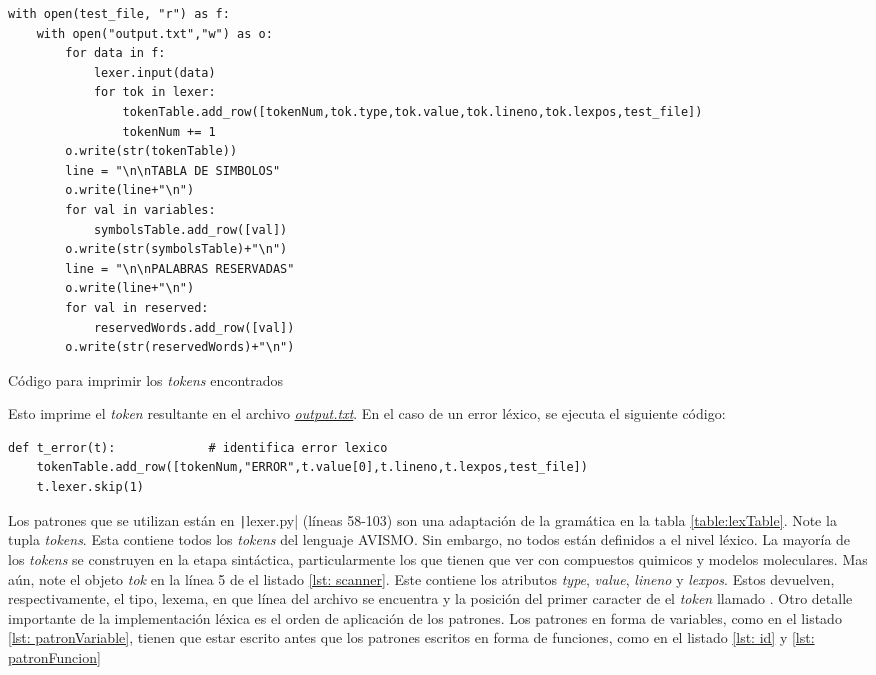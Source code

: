 \begin{listing}[H]
    \begin{verbatim}
with open(test_file, "r") as f:
    with open("output.txt","w") as o:
        for data in f:
            lexer.input(data)
            for tok in lexer:
                tokenTable.add_row([tokenNum,tok.type,tok.value,tok.lineno,tok.lexpos,test_file])
                tokenNum += 1
        o.write(str(tokenTable))
        line = "\n\nTABLA DE SIMBOLOS"
        o.write(line+"\n")
        for val in variables:
            symbolsTable.add_row([val])
        o.write(str(symbolsTable)+"\n")
        line = "\n\nPALABRAS RESERVADAS"
        o.write(line+"\n")
        for val in reserved:
            reservedWords.add_row([val])
        o.write(str(reservedWords)+"\n")
\end{verbatim}
    \caption{Código para imprimir los \textit{tokens} encontrados}
    \label{lst: scanner}
\end{listing}
Esto imprime el \textit{token} resultante en el archivo \href{https://github.com/aramis-matos/comp4999_compilers_project/blob/master/code/python_remake/output.txt}{\textit{output.txt}}. En el caso de un error léxico, se ejecuta el siguiente código:
\begin{verbatim}
def t_error(t):             # identifica error lexico
    tokenTable.add_row([tokenNum,"ERROR",t.value[0],t.lineno,t.lexpos,test_file])
    t.lexer.skip(1)
\end{verbatim}
Los patrones que se utilizan están en \texttt|lexer.py| (líneas 58-103) son una adaptación de la gramática en la tabla \ref{table:lexTable}. Note la tupla \textit{tokens}.
Esta contiene todos los \textit{tokens} del lenguaje AVISMO. Sin embargo, no todos están definidos a el nivel léxico. La mayoría de los \textit{tokens} se construyen en la etapa sintáctica, particularmente los que tienen que ver con compuestos quimicos y modelos moleculares.
Mas aún, note el objeto \textit{tok} en la línea 5 de el listado \ref{lst: scanner}. Este contiene los atributos \textit{type}, \textit{value}, \textit{lineno} y \textit{lexpos}. Estos devuelven, respectivamente, el tipo, lexema, en que línea del archivo se encuentra y la posición del primer caracter de el \textit{token} llamado . Otro detalle importante de la implementación léxica es el orden de aplicación de los patrones. Los patrones en forma de variables, como en el listado \ref{lst: patronVariable}, tienen que estar escrito antes que los patrones escritos en forma de funciones, como en el listado \ref{lst: id} y \ref{lst: patronFuncion}

